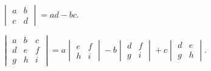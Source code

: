 \begin{formulasheet}
 \item $ \begin{vmatrix}
a & b \\
c & d
\end{vmatrix} = ad - bc$.
\item $ \begin{vmatrix}
a & b  & c\\
d & e  & f\\
g & h & i
\end{vmatrix} = a\begin{vmatrix}
e & f \\
h & i
\end{vmatrix}  - b \begin{vmatrix}
d & f \\
g & i
\end{vmatrix} + c \begin{vmatrix}
d & e \\
g & h
\end{vmatrix}  $.
\end{formulasheet}